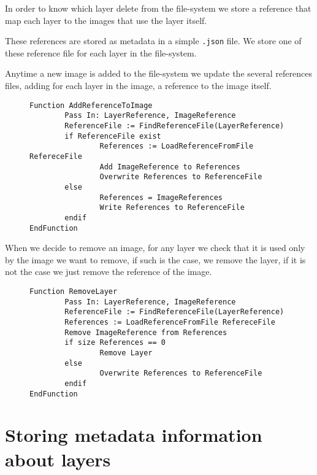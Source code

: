 In order to know which layer delete from the file-system we store a reference that map each layer to the images that use the layer itself.

These references are stored as metadata in a simple \texttt{.json} file.
We store one of these reference file for each layer in the file-system.

Anytime a new image is added to the file-system we update the several references files, adding for each layer in the image, a reference to the image itself.

\begin{figure}
\begin{lstlisting}[caption={Algorithm to add an image reference to the layer metadata}, label={lst:add-image-reference-to-layer}]
Function AddReferenceToImage
        Pass In: LayerReference, ImageReference
        ReferenceFile := FindReferenceFile(LayerReference)
        if ReferenceFile exist
                References := LoadReferenceFromFile RefereceFile
                Add ImageReference to References
                Overwrite References to ReferenceFile
        else 
                References = ImageReferences
                Write References to ReferenceFile
        endif
EndFunction
\end{lstlisting}
\end{figure}

When we decide to remove an image, for any layer we check that it is used only by the image we want to remove, if such is the case, we remove the layer, if it is not the case we just remove the reference of the image.

\begin{figure}
\begin{lstlisting}[caption={Algorithm to remove an image from the file-system}, label={lst:remove-layer}]
Function RemoveLayer
        Pass In: LayerReference, ImageReference
        ReferenceFile := FindReferenceFile(LayerReference)
        References := LoadReferenceFromFile RefereceFile
        Remove ImageReference from References
        if size References == 0
                Remove Layer
        else
                Overwrite References to ReferenceFile
        endif
EndFunction
\end{lstlisting}
\end{figure}

\section{Storing metadata information about layers}

